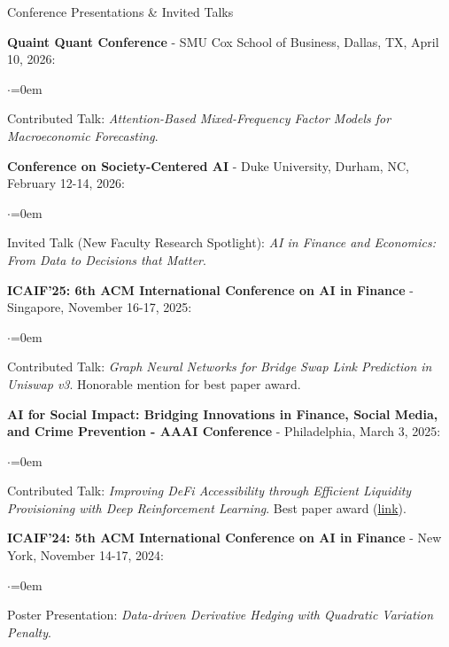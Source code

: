 \documentclass{resume} %
\begin{document}
\begin{rSection}{Conference Presentations \& Invited Talks}

\textbf{Quaint Quant Conference} - SMU Cox School of Business, Dallas, TX, April 10, 2026:
\begin{list}{$\cdot$}{\leftmargin=0em}
\item Contributed Talk: \emph{Attention-Based Mixed-Frequency Factor Models for Macroeconomic Forecasting}.
\end{list}

\textbf{Conference on Society-Centered AI} - Duke University, Durham, NC, February 12-14, 2026:
\begin{list}{$\cdot$}{\leftmargin=0em}
\item Invited Talk (New Faculty Research Spotlight): \emph{AI in Finance and Economics: From Data to Decisions that Matter}.
\end{list}

\textbf{ICAIF'25: 6th ACM International Conference on AI in Finance} - Singapore, November 16-17, 2025:
\begin{list}{$\cdot$}{\leftmargin=0em}
\item Contributed Talk: \emph{Graph Neural Networks for Bridge Swap Link Prediction in Uniswap v3}. Honorable mention for best paper award.
\end{list}

\textbf{AI for Social Impact: Bridging Innovations in Finance, Social Media, and Crime Prevention - AAAI Conference} - Philadelphia, March 3, 2025:
\begin{list}{$\cdot$}{\leftmargin=0em}
\item Contributed Talk: \emph{Improving DeFi Accessibility through Efficient Liquidity Provisioning with Deep Reinforcement Learning}. Best paper award (\href{https://sites.google.com/view/aaai-2025-ai-si/best-paper?authuser=0}{link}).
\end{list}

\textbf{ICAIF'24: 5th ACM International Conference on AI in Finance} - New York, November 14-17, 2024:
\begin{list}{$\cdot$}{\leftmargin=0em}
\item Poster Presentation: \emph{Data-driven Derivative Hedging with Quadratic Variation Penalty}.
\end{list}


\end{rSection}
\end{document}
